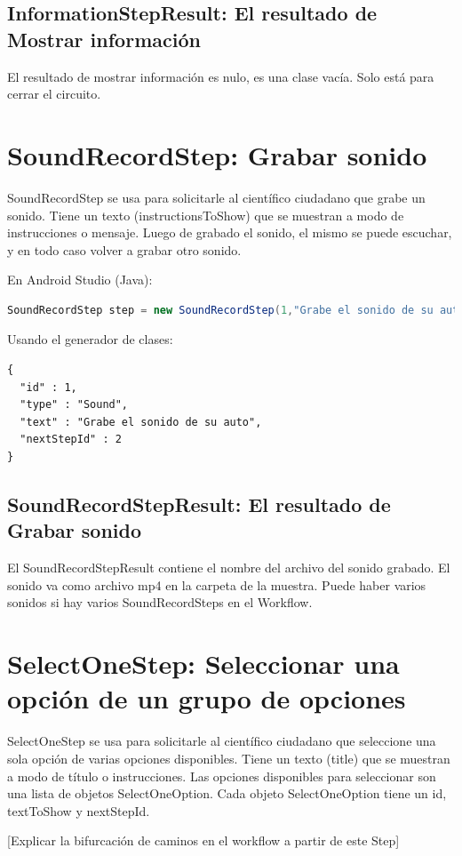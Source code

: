 \subsection{InformationStepResult: El resultado de Mostrar información}
El resultado de mostrar información es nulo, es una clase vacía. Solo está para cerrar el circuito.


\section{SoundRecordStep: Grabar sonido}
SoundRecordStep  se usa para solicitarle al científico ciudadano que grabe un sonido. Tiene un texto (instructionsToShow) que se muestran a modo de instrucciones o mensaje. Luego de grabado el sonido, el mismo se puede escuchar, y en todo caso volver a grabar otro sonido.

En Android Studio (Java):
\begin{lstlisting}[language=Java, frame=tlb]	
SoundRecordStep step = new SoundRecordStep(1,"Grabe el sonido de su auto",2); 
\end{lstlisting}

Usando el generador de clases:
\begin{lstlisting}[language=XML, frame=tlb]	
{
  "id" : 1,
  "type" : "Sound",
  "text" : "Grabe el sonido de su auto",
  "nextStepId" : 2
}
\end{lstlisting}

\subsection{SoundRecordStepResult: El resultado de Grabar sonido}
El SoundRecordStepResult contiene el nombre del archivo del sonido grabado. El sonido va como archivo mp4 en la carpeta de la muestra.
Puede haber varios sonidos si hay varios SoundRecordSteps en el Workflow.


\section{SelectOneStep: Seleccionar una opción de un grupo de opciones}
SelectOneStep  se usa para solicitarle al científico ciudadano que seleccione una sola opción de varias opciones disponibles. Tiene un texto (title) que se muestran a modo de título o instrucciones. Las opciones disponibles para seleccionar son una lista de objetos SelectOneOption.
Cada objeto SelectOneOption tiene un id, textToShow y nextStepId.

[Explicar la bifurcación de caminos en el workflow a partir de este Step]

